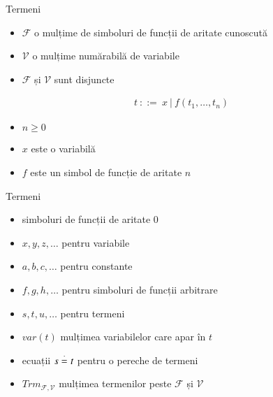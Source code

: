 \documentclass[xcolor=pdftex,romanian,colorlinks]{beamer}
\begin{document}
\begin{frame}{Termeni}

\vspace{-.2cm}
\begin{itemize}
	\item $\mathcal{F}$ o mulțime de simboluri de funcții de aritate cunoscută
	\item $\mathcal{V}$ o mulțime numărabilă de variabile 
	\item $\mathcal{F}$ și $\mathcal{V}$ sunt disjuncte
\end{itemize}

  \bigskip
{}
\vspace{-.2cm}
\begin{align*}
t \ ::= \ x\ |\ f(t_1,\ldots,t_n)
\end{align*}
\vspace{-1cm}
\begin{itemize}
	\item $n \geq 0$
	\item $x$ este o variabilă
	\item $f$ este un simbol de funcție de aritate $n$ 
\end{itemize}

\end{frame}

\begin{frame}{Termeni}
\vspace{-.2cm}
\begin{itemize}
	\item {} simboluri de funcții de aritate $0$
	\item $x,y,z,\ldots$ pentru variabile
	\item $a,b,c,\ldots$ pentru constante
	\item $f,g,h,\ldots$ pentru simboluri de funcții arbitrare
	\item $s,t,u,\ldots$ pentru termeni
	\item $var(t)$ mulțimea variabilelor care apar în $t$
	\item ecuații $s \stackrel{\cdot}{=}_{} t$ pentru o pereche de termeni
	\item $Trm_{\mathcal{F,\mathcal{V}}}$ mulțimea termenilor peste $\mathcal{F}$ și $\mathcal{V}$
\end{itemize}

\end{frame}
\end{document}
